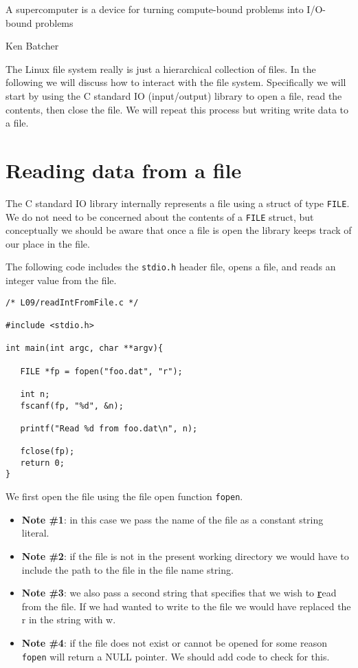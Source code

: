 
\epigraph{A supercomputer is a device for turning compute-bound problems into I/O-bound problems}{Ken Batcher}

\minitoc

The Linux file system really is just a hierarchical collection of files. In the following we will discuss how to interact with the file system. Specifically we will start by using the C standard IO (input/output) library to open a  file, read the contents, then close the file. We will repeat this process but writing write data to a file. 

\section{Reading data from a file}

The C standard IO library internally represents a file using a struct of type \texttt{FILE}. We do not need to be concerned about the contents of a \texttt{FILE} struct, but conceptually we should be aware that once a file is open the library keeps track of our place in the file. 

The following code includes the \texttt{stdio.h} header file, opens a file, and reads an integer value from the file.

\begin{verbatim}
/* L09/readIntFromFile.c */

#include <stdio.h>

int main(int argc, char **argv){
  
   FILE *fp = fopen("foo.dat", "r");
   
   int n;
   fscanf(fp, "%d", &n);
   
   printf("Read %d from foo.dat\n", n);
   
   fclose(fp);
   return 0;
}
\end{verbatim}

We first open the file using the file open function \texttt{fopen}. 
\begin{itemize}
\item[]{\bf Note \#1}: in this case we pass the name of the file as a constant string literal. 

\item[]{\bf Note \#2}: if the file is not in the present working directory we would have to include the path to the file in the file name string.

\item[]{\bf Note \#3}: we also pass a second string that specifies that we wish to \underline{\bf r}ead from the file. If we had wanted to write to the file we would have replaced the r in the string with w.

\item[]{\bf Note \#4}: if the file does not exist or cannot be opened for some reason \texttt{fopen} will return a NULL pointer. We should add code to check for this.
\end{itemize}

